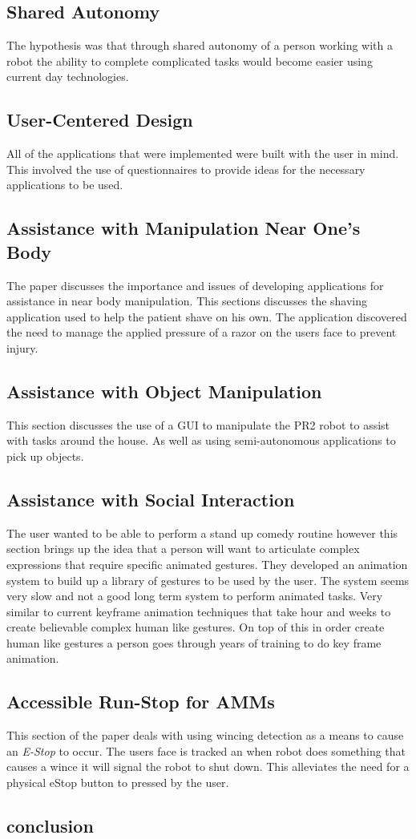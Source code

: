 \documentclass[10pt,a4paper]{article}
\begin{document}
\subsection{Shared Autonomy}
The hypothesis was that through shared autonomy of a person working with a robot the ability to complete complicated tasks would become easier using current day technologies.
\subsection{User-Centered Design}
All of the applications that were implemented were built with the user in mind. This involved the use of questionnaires to provide ideas for the necessary applications to be used.
\subsection{Assistance with Manipulation Near One's Body}
The paper discusses the importance and issues of developing applications for assistance in near body manipulation. This sections discusses the shaving application used to help the patient shave on his own. The application discovered the need to manage the applied pressure of a razor on the users face to prevent injury.
\subsection{Assistance with Object Manipulation}
This section discusses the use of a GUI to manipulate the PR2 robot to assist with tasks around the house. As well as using semi-autonomous applications to pick up objects.
\subsection{Assistance with Social Interaction}
The user wanted to be able to perform a stand up comedy routine however this section brings up the idea that a person will want to articulate complex expressions that require specific animated gestures. They developed an animation system to build up a library of gestures to be used by the user. The system seems very slow and not a good long term system to perform animated tasks. Very similar to current keyframe animation techniques that take hour and weeks to create believable complex human like gestures. On top of this in order create human like gestures a person goes through years of training to do key frame animation.
\subsection{Accessible Run-Stop for AMMs}
This section of the paper deals with using wincing detection as a means to cause an \emph{E-Stop} to occur. The users face is tracked an when robot does something that causes a wince it will signal the robot to shut down. This alleviates the need for a physical eStop button to pressed by the user.
\subsection{conclusion}
\end{document}
